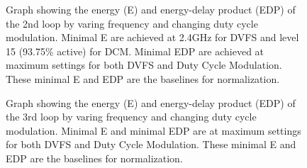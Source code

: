 \begin{figure}[bt]
\centering
{}
\caption{Graph showing the energy (E) and energy-delay product (EDP) of the 2nd loop
by varing frequency and changing duty cycle modulation. Minimal E are achieved at 2.4GHz for DVFS and 
level 15 (93.75\% active) for DCM. Minimal EDP are achieved at maximum settings for both DVFS and Duty Cycle Modulation. These minimal E and EDP are the baselines for normalization.}
\label{fig:Brdr2d-TE}
\end{figure}

\begin{figure}[bt]
\centering
{}
\caption{Graph showing the energy (E) and energy-delay product (EDP) of the 3rd loop
by varing frequency and changing duty cycle modulation. Minimal E and minimal EDP 
are at maximum settings for both DVFS and Duty Cycle Modulation. These minimal E and EDP are the baselines for normalization.}
\label{fig:Brdr2d-TE}
\end{figure}
